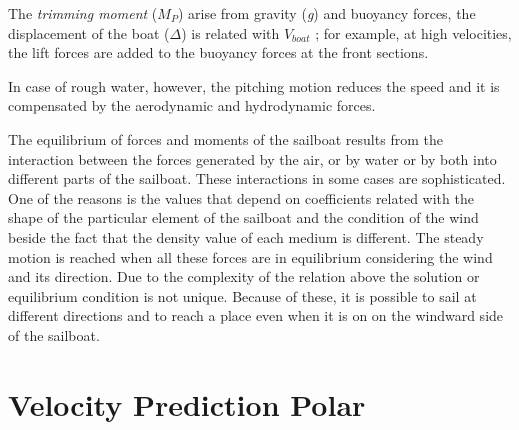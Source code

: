 
The \textit{trimming moment} ($M_{P}$) arise from gravity (\textit{g}) and buoyancy forces, the displacement of the boat (\textit{$\Delta$}) is related with $V_{boat}$ ; for example, at high velocities, the lift forces are added to the buoyancy forces at the front sections. 

In case of rough water, however, the pitching motion reduces the speed and it is compensated by the aerodynamic and hydrodynamic forces\cite{claughton1998sailing}.\par 

The equilibrium of forces and moments of the sailboat results from the interaction between the forces generated by the air, or by  water or by both into different parts of the sailboat. These interactions in some cases are sophisticated. One of the reasons is the values that depend on coefficients related with the shape of the particular element of the sailboat and the condition of the wind beside the fact that the density value of each medium is different. The steady motion is reached when all these forces are in equilibrium considering the wind and its direction. Due to the complexity of the relation above the solution or equilibrium condition is not unique. Because of these, it is possible to sail at different directions and to reach a place even when it is on on the windward side of the sailboat. 
\section{Velocity Prediction Polar} \label{sec:VPP}


